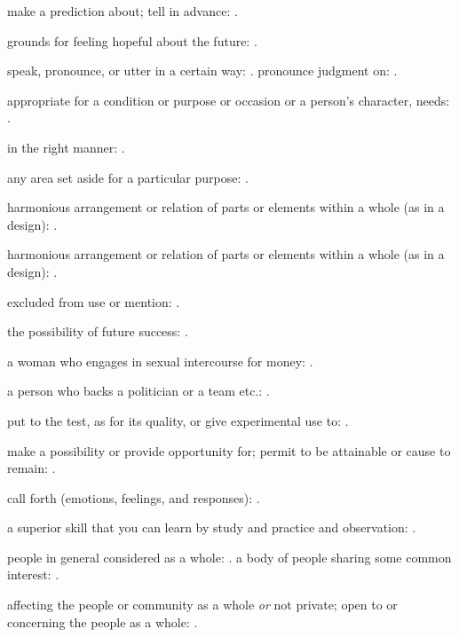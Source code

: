   make a prediction about; tell in advance: .

  grounds for feeling hopeful about the future: .

  speak, pronounce, or utter in a certain way: . pronounce judgment on: .

  appropriate for a condition or purpose or occasion or a person's character, needs: .

  in the right manner: .

  any area set aside for a particular purpose: .

  harmonious arrangement or relation of parts or elements within a whole (as in a design): .

  harmonious arrangement or relation of parts or elements within a whole (as in a design): .

  excluded from use or mention: .

  the possibility of future success: .

  a woman who engages in sexual intercourse for money: .

  a person who backs a politician or a team etc.: .

  put to the test, as for its quality, or give experimental use to: .

  make a possibility or provide opportunity for; permit to be attainable or cause to remain: .

  call forth (emotions, feelings, and responses): .

  a superior skill that you can learn by study and practice and observation: .

  people in general considered as a whole: . a body of people sharing some common interest: .

  affecting the people or community as a whole \textit{or} not private; open to or concerning the people as a whole: .

